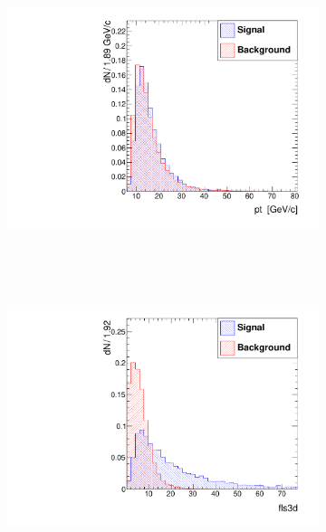 \documentclass[10pt,a4paper]{article}
\begin{document}
\begin{figure}
        \centering
        \begin{subfigure}[b]{0.2\textwidth}
                \centering
                \includegraphics[width=\textwidth]{Figures/pt_barrel}
                \label{fig:ptBarrel}
        \end{subfigure}
        ~
        \begin{subfigure}[b]{0.2\textwidth}
                \centering
                \label{fig:etaBarrel}
        \end{subfigure}
        ~
        \begin{subfigure}[b]{0.2\textwidth}
                \centering
                \includegraphics[width=\textwidth]{Figures/fls3d_barrel}

\end{subfigure}
\end{figure}
\end{document}
